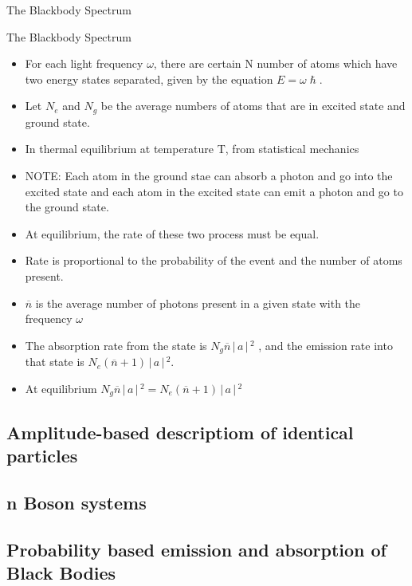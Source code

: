 \documentclass[aspectratio=169]{beamer}
\begin{document}
\begin{frame}{The Blackbody Spectrum}

\end{frame}
\begin{frame}{The Blackbody Spectrum}
	\begin{itemize}
	 \item For each light frequency $\omega$, there are certain N number of atoms which have two energy states separated, given by the equation $E = \omega\hslash$. \newline
	 \item Let $N_{e}$ and $N_{g}$ be the average numbers of atoms that are in excited state and ground state. \newline
	 \item In thermal equilibrium at temperature T, from statistical mechanics \newline
	\item NOTE: Each atom in the ground stae can absorb a photon and go into the excited state and each atom in the excited state can emit a photon and go to the ground state.
	\end{itemize}
\end{frame} 

\begin{frame}
	\begin{itemize}
		\item At equilibrium, the rate of these two process must be equal. \newline
		\item Rate is proportional to the probability of the event and the number of atoms present.\newline
		\item $\overline{n}$ is the average number of photons present in a given state with the frequency $\omega$
	\end{itemize}
\end{frame}

\begin{frame}
	\begin{itemize}
		\item The absorption rate from the state is $N_{g}\overline{n}\,\Bigr\rvert\,a\,\Bigr\rvert\,^{2}$ , and the emission rate into that state is $N_{e}(\overline{n}+1)\,\Bigr\rvert\,a\,\Bigr\rvert\,^{2}$.
		\item At equilibrium  $N_{g}\overline{n}\,\Bigr\rvert\,a\,\Bigr\rvert\,^{2} = N_{e}(\overline{n}+1)\,\Bigr\rvert\,a\,\Bigr\rvert\,^{2}$
	\end{itemize}
\end{frame}

\subsection{Amplitude-based descriptiom of identical particles}

\subsection{n Boson systems}

\subsection{Probability based emission and absorption of Black Bodies}
\end{document}
